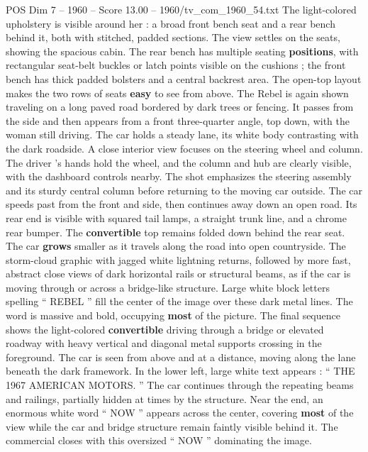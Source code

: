 \begin{textsample}{POS Dim 7 – 1960 – Score 13.00 – 1960/tv\_com\_1960\_54.txt}
The light-colored upholstery is visible around her : a broad front bench seat and a rear bench behind it, both with stitched, padded sections.
The view settles on the seats, showing the spacious cabin.
The rear bench has multiple seating \textbf{positions}, with rectangular seat-belt buckles or latch points visible on the cushions ; the front bench has thick padded bolsters and a central backrest area.
The open-top layout makes the two rows of seats \textbf{easy} to see from above.
The Rebel is again shown traveling on a long paved road bordered by dark trees or fencing.
It passes from the side and then appears from a front three-quarter angle, top down, with the woman still driving.
The car holds a steady lane, its white body contrasting with the dark roadside.
A close interior view focuses on the steering wheel and column.
The driver ’s hands hold the wheel, and the column and hub are clearly visible, with the dashboard controls nearby.
The shot emphasizes the steering assembly and its sturdy central column before returning to the moving car outside.
The car speeds past from the front and side, then continues away down an open road.
Its rear end is visible with squared tail lamps, a straight trunk line, and a chrome rear bumper.
The \textbf{convertible} top remains folded down behind the rear seat.
The car \textbf{grows} smaller as it travels along the road into open countryside.
The storm-cloud graphic with jagged white lightning returns, followed by more fast, abstract close views of dark horizontal rails or structural beams, as if the car is moving through or across a bridge-like structure.
Large white block letters spelling “ REBEL ” fill the center of the image over these dark metal lines.
The word is massive and bold, occupying \textbf{most} of the picture.
The final sequence shows the light-colored \textbf{convertible} driving through a bridge or elevated roadway with heavy vertical and diagonal metal supports crossing in the foreground.
The car is seen from above and at a distance, moving along the lane beneath the dark framework.
In the lower left, large white text appears : “ THE 1967 AMERICAN MOTORS. ” The car continues through the repeating beams and railings, partially hidden at times by the structure.
Near the end, an enormous white word “ NOW ” appears across the center, covering \textbf{most} of the view while the car and bridge structure remain faintly visible behind it.
The commercial closes with this oversized “ NOW ” dominating the image.

\end{textsample}
